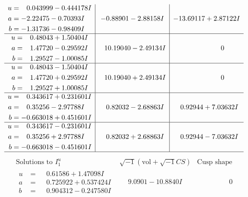 \documentclass[1p]{elsarticle_modified}
\theoremstyle{definition}
\newcommand{\I}{\sqrt{-1}}
\begin{document}
$$\begin{array}{c|c|c}
\begin{aligned}
u &= \phantom{-}0.043999 - 0.444178 I \\
a &= -2.22475 - 0.70393 I \\
b &= -1.31736 - 0.98409 I\end{aligned}
 & -0.88901 - 2.88158 I & -13.69117 + 2.87122 I \\ \hline\begin{aligned}
u &= \phantom{-}0.48043 + 1.50404 I \\
a &= \phantom{-}1.47720 - 0.29592 I \\
b &= \phantom{-}1.29527 - 1.00085 I\end{aligned}
 & \phantom{-}10.19040 - 2.49134 I & \phantom{-0.000000 } 0 \\ \hline\begin{aligned}
u &= \phantom{-}0.48043 - 1.50404 I \\
a &= \phantom{-}1.47720 + 0.29592 I \\
b &= \phantom{-}1.29527 + 1.00085 I\end{aligned}
 & \phantom{-}10.19040 + 2.49134 I & \phantom{-0.000000 } 0 \\ \hline\begin{aligned}
u &= \phantom{-}0.343617 + 0.231601 I \\
a &= \phantom{-}0.35256 - 2.97788 I \\
b &= -0.663018 + 0.451601 I\end{aligned}
 & \phantom{-}0.82032 - 2.68863 I & \phantom{-}0.92944 + 7.03632 I \\ \hline\begin{aligned}
u &= \phantom{-}0.343617 - 0.231601 I \\
a &= \phantom{-}0.35256 + 2.97788 I \\
b &= -0.663018 - 0.451601 I\end{aligned}
 & \phantom{-}0.82032 + 2.68863 I & \phantom{-}0.92944 - 7.03632 I\\
 \hline 
 \end{array}$$\newpage$$\begin{array}{c|c|c}  
\text{Solutions to }I^u_{1}& \I (\text{vol} + \sqrt{-1}CS) & \text{Cusp shape}\\
 \hline 
\begin{aligned}
u &= \phantom{-}0.61586 + 1.47098 I \\
a &= \phantom{-}0.725922 + 0.537424 I \\
b &= \phantom{-}0.904312 - 0.247580 I\end{aligned}
 & \phantom{-}9.0901 - 10.8840 I & \phantom{-0.000000 } 0 \\ \hline\begin{aligned}

\end{aligned}
\end{array}$$
\end{document}
